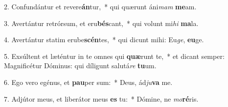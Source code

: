 2. Confundántur et revere\textbf{án}tur,~*  qui quærunt áni\textit{mam} \textbf{me}am.\

3. Avertántur retrórsum, et eru\textbf{bés}cant,~*  qui volunt mi\textit{hi} \textbf{ma}la.\

4. Avertántur statim erube\textbf{scén}tes,~*  qui dicunt mihi: Eu\textit{ge}, \textbf{eu}ge.\

5. Exsúltent et læténtur in te omnes qui \textbf{quæ}runt te,~*  et dicant semper: Magnificétur Dóminus: qui díligunt salutá\textit{re} \textbf{tu}um.\

6. Ego vero egénus, et \textbf{pau}per sum:~*  Deus, ád\textit{ju}\textbf{va} me.\

7. Adjútor meus, et liberátor meus \textbf{es} tu:~*  Dómine, ne \textit{mo}\textbf{ré}ris.\

